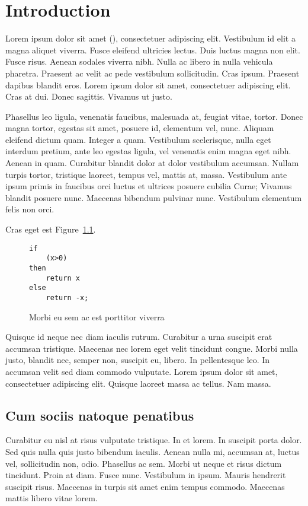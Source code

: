 \chapter{Introduction}

Lorem ipsum dolor sit amet (\cite{GHZ,EPR35}), consectetuer
adipiscing elit. Vestibulum id elit a magna aliquet viverra. Fusce
eleifend ultricies lectus. Duis luctus magna non elit. Fusce
risus. Aenean sodales viverra nibh. Nulla ac libero in nulla
vehicula pharetra. Praesent ac velit ac pede vestibulum
sollicitudin. Cras ipsum. Praesent dapibus blandit eros. Lorem
ipsum dolor sit amet, consectetuer adipiscing elit. Cras at dui.
Donec sagittis. Vivamus ut justo.

Phasellus \cite{Boojums} leo ligula, venenatis faucibus, malesuada
at, feugiat vitae, tortor. Donec magna tortor, egestas sit amet,
posuere id, elementum vel, nunc. Aliquam eleifend dictum quam.
Integer a quam. Vestibulum scelerisque, nulla eget interdum
pretium, ante leo egestas ligula, vel venenatis enim magna eget
nibh. Aenean in quam. Curabitur blandit dolor at dolor vestibulum
accumsan. Nullam turpis tortor, tristique laoreet, tempus vel,
mattis at, massa. Vestibulum ante ipsum primis in faucibus orci
luctus et ultrices posuere cubilia Curae; Vivamus blandit posuere
nunc. Maecenas bibendum pulvinar nunc. Vestibulum elementum felis
non orci.

Cras eget est Figure~\ref{fig:conditional}.

\begin{figure}
\begin{verbatim}
if
    (x>0)
then
    return x
else
    return -x;
\end{verbatim}
\caption{Morbi eu sem ac est porttitor viverra}
\label{fig:conditional}
\end{figure}


 Quisque id neque nec diam iaculis
rutrum.  Curabitur a urna suscipit erat accumsan tristique.
Maecenas nec lorem eget velit tincidunt congue. Morbi nulla justo,
blandit nec, semper non, suscipit eu, libero. In pellentesque leo.
In accumsan velit sed diam commodo vulputate. Lorem ipsum dolor
sit amet, consectetuer adipiscing elit. Quisque laoreet massa ac
tellus. Nam massa.

\section{Cum sociis natoque penatibus} \label{sec:introduction}

Curabitur eu nisl at risus vulputate tristique. In et lorem. In
suscipit porta dolor. Sed quis nulla quis justo bibendum iaculis.
Aenean nulla mi, accumsan at, luctus vel, sollicitudin non, odio.
Phasellus ac sem. Morbi ut neque et risus dictum tincidunt. Proin
at diam. Fusce nunc. Vestibulum in ipsum. Mauris hendrerit
suscipit risus. Maecenas in turpis sit amet enim tempus commodo.
Maecenas mattis libero vitae lorem.

